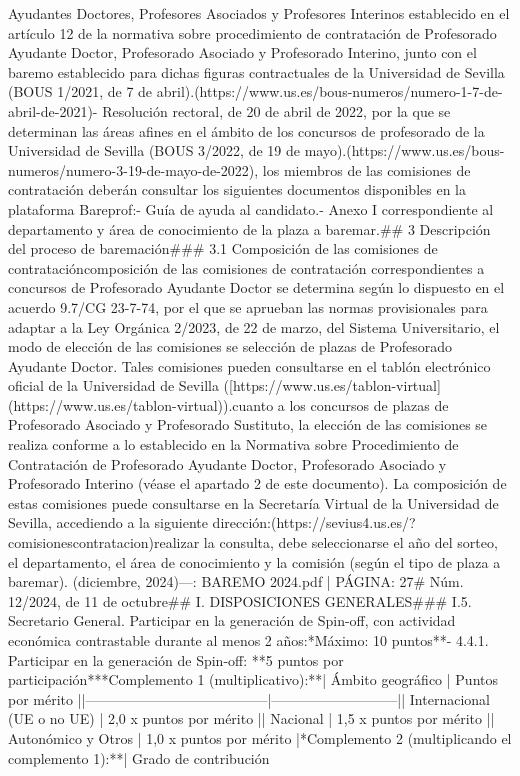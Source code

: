 \documentclass{article}
\begin{document}
\begin{itemize}
{{{{Ayudantes Doctores, Profesores Asociados y Profesores Interinos establecido en el artículo 12 de la normativa sobre procedimiento de contratación de Profesorado Ayudante Doctor, Profesorado Asociado y Profesorado Interino, junto con el baremo establecido para dichas figuras contractuales de la Universidad de Sevilla (BOUS 1/2021, de 7 de abril).(https://www.us.es/bous-numeros/numero-1-7-de-abril-de-2021)\n\n- Resolución rectoral, de 20 de abril de 2022, por la que se determinan las áreas afines en el ámbito de los concursos de profesorado de la Universidad de Sevilla (BOUS 3/2022, de 19 de mayo).(https://www.us.es/bous-numeros/numero-3-19-de-mayo-de-2022)\n\nAsimismo, los miembros de las comisiones de contratación deberán consultar los siguientes documentos disponibles en la plataforma Bareprof:\n- Guía de ayuda al candidato.\n- Anexo I correspondiente al departamento y área de conocimiento de la plaza a baremar.\n\n## 3 Descripción del proceso de baremación\n\n### 3.1 Composición de las comisiones de contratación\n\nLa composición de las comisiones de contratación correspondientes a concursos de Profesorado Ayudante Doctor se determina según lo dispuesto en el acuerdo 9.7/CG 23-7-74, por el que se aprueban las normas provisionales para adaptar a la Ley Orgánica 2/2023, de 22 de marzo, del Sistema Universitario, el modo de elección de las comisiones se selección de plazas de Profesorado Ayudante Doctor. Tales comisiones pueden consultarse en el tablón electrónico oficial de la Universidad de Sevilla ([https://www.us.es/tablon-virtual](https://www.us.es/tablon-virtual)).\n\nEn cuanto a los concursos de plazas de Profesorado Asociado y Profesorado Sustituto, la elección de las comisiones se realiza conforme a lo establecido en la Normativa sobre Procedimiento de Contratación de Profesorado Ayudante Doctor, Profesorado Asociado y Profesorado Interino (véase el apartado 2 de este documento). La composición de estas comisiones puede consultarse en la Secretaría Virtual de la Universidad de Sevilla, accediendo a la siguiente dirección:(https://sevius4.us.es/?comisionescontratacion)\n\nPara realizar la consulta, debe seleccionarse el año del sorteo, el departamento, el área de conocimiento y la comisión (según el tipo de plaza a baremar).\n{} (diciembre, 2024)\n\n---\n\nFUENTE: BAREMO 2024.pdf | PÁGINA: 27\n# Núm. 12/2024, de 11 de octubre\n\n## I. DISPOSICIONES GENERALES\n\n### I.5. Secretario General\n{}. Participar en la generación de Spin-off, con actividad económica contrastable durante al menos 2 años:\n**Máximo: 10 puntos**\n- 4.4.1. Participar en la generación de Spin-off: **5 puntos por participación**\n\n**Complemento 1 (multiplicativo):**\n| Ámbito geográfico                     | Puntos por mérito         |\n|---------------------------------------|---------------------------|\n| Internacional (UE o no UE)           | 2,0 x puntos por mérito   |\n| Nacional                              | 1,5 x puntos por mérito   |\n| Autonómico y Otros                   | 1,0 x puntos por mérito   |\n\n**Complemento 2 (multiplicando el complemento 1):**\n| Grado de contribución       }}}}
\end{itemize}
\end{document}
